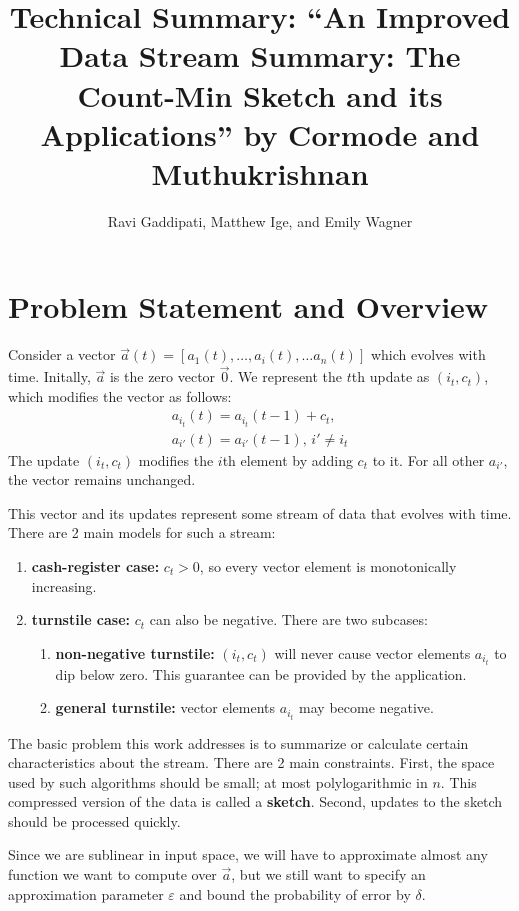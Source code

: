\documentclass[11pt]{article}
\title{Technical Summary: ``An Improved Data Stream Summary: The Count-Min Sketch and its Applications'' 
by Cormode and Muthukrishnan}
\author{Ravi Gaddipati, Matthew Ige, and Emily Wagner}
\begin{document}
\maketitle
\section{Problem Statement and Overview}
Consider a vector $\vec{a}(t) = [a_1(t), \dots, a_i(t), \dots a_n(t)]$ which evolves with time.
Initally, $\vec{a}$ is the zero vector $\vec{0}$.  We represent the $t$th update as $(i_t, c_t)$,
which modifies the vector as follows:
\begin{align}
    a_{i_t}(t) = a_{i_t}(t - 1) + c_t, \\
    a_{i'}(t) = a_{i'}(t - 1), \, i' \neq i_t
\end{align}
The update $(i_t, c_t)$ modifies the $i$th element by adding $c_t$ to it.
For all other $a_{i'}$, the vector remains unchanged. 

This vector and its updates represent some stream of data that evolves with
time. There are 2 main models for such a stream:
\begin{enumerate}
    \item \textbf{cash-register case:} $c_t > 0$, so every vector element is monotonically
    increasing.
    \item \textbf{turnstile case:} $c_t$ can also be negative.  There are two subcases:
    \begin{enumerate}
        \item \textbf{non-negative turnstile:} $(i_t, c_t)$ will never cause vector elements
        $a_{i_t}$ to dip below zero. This guarantee can be provided by the application.
        \item \textbf{general turnstile:} vector elements $a_{i_t}$ may become negative.
    \end{enumerate}
\end{enumerate}

The basic problem this work addresses is to summarize or calculate certain
characteristics about the stream. There are 2 main constraints. First, the space
used by such algorithms should be small; at most polylogarithmic in $n$.  This
compressed version of the data is called a \textbf{sketch}.  Second, updates to
the sketch should be processed quickly.  

Since we are sublinear in input space, we will have to approximate almost any
function we want to compute over $\vec{a}$, but we still want to specify an
approximation parameter $\varepsilon$ and bound the probability of error by
$\delta$.  
\end{document}
